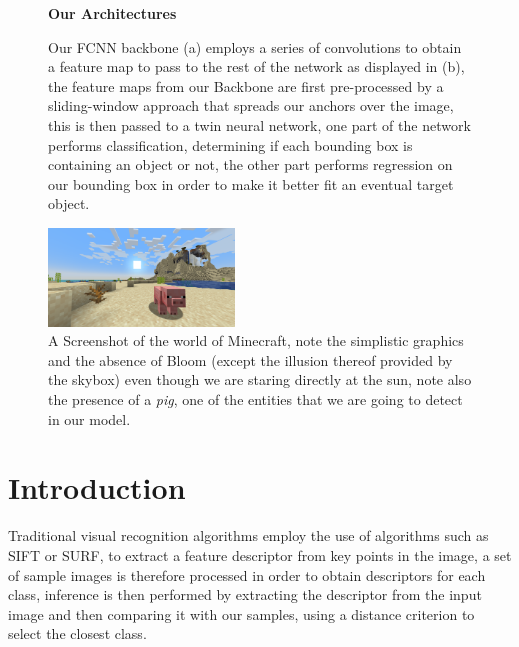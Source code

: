 \documentclass[10pt,journal,cspaper,compsoc]{IEEEtran}
\newcommand*{\figuretitle}[1]{%
    {\centering%
    \textbf{#1}%
    \par\medskip}%
}
\begin{document}
\begin{figure}[tb]
    \centering
    \figuretitle{Our Architectures}
     \hfill
    \caption{Our FCNN backbone (a) employs a series of convolutions to obtain a feature map to pass to 
    the rest of the network as displayed in (b), the feature maps from our Backbone are first pre-processed
    by a sliding-window approach that spreads our anchors over the image, this is then passed to a twin neural
    network, one part of the network performs classification, determining if each bounding box is containing an
    object or not, the other part performs regression on our bounding box in order to make it better fit an eventual
    target object.}
    \label{fig:network}
\end{figure}


\begin{figure}[tb]
    \centering
    \includegraphics[width=0.44\textwidth]{images/pig.png}
    \caption{A Screenshot of the world of Minecraft, note the simplistic graphics and the absence of Bloom (except the illusion thereof provided by the 
    skybox) even though we are staring directly at the sun, note also the presence of a \emph{pig}, one of the entities that we are going to detect 
    in our model.}
    \label{fig:piggy}
\end{figure}

    \section{Introduction}
    Traditional visual recognition algorithms employ the use of algorithms such as SIFT 
    or SURF\cite{Lowe:SIFT,Bay:SURF}, to extract a feature descriptor from key points 
    in the image, a set of sample images is therefore processed in order to obtain descriptors 
    for each class, inference is then performed by extracting the descriptor from the input image 
    and then comparing it with our samples, using a distance criterion to select the closest class.
\end{document}
